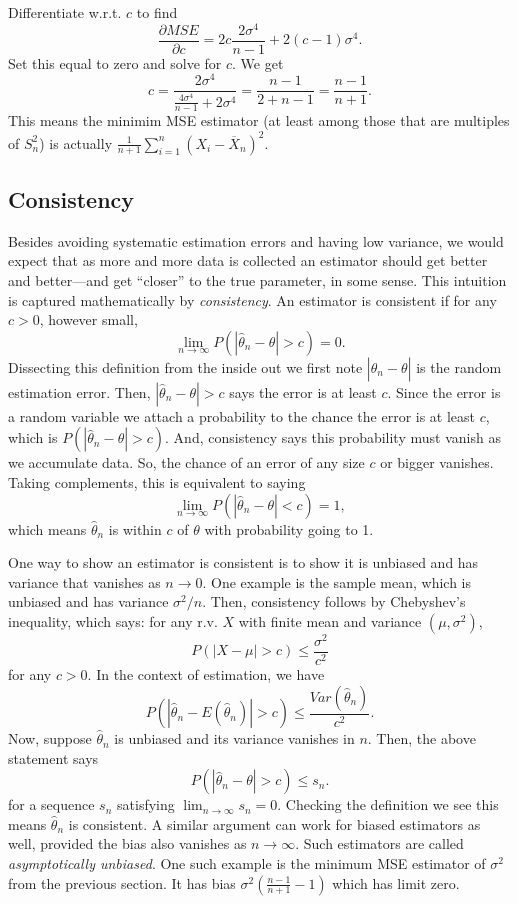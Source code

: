 \documentclass[]{book}
\begin{document}
Differentiate w.r.t. \(c\) to find
\[\frac{\partial MSE}{\partial c} = 2c \frac{2\sigma^4}{n-1} + 2(c-1)\sigma^4.\]
Set this equal to zero and solve for \(c\). We get
\[c = \frac{2\sigma^4}{\frac{4\sigma^4}{n-1} + 2\sigma^4} = \frac{n-1}{2+n-1} = \frac{n-1}{n+1}.\]
This means the minimim MSE estimator (at least among those that are
multiples of \(S_n^2\)) is actually
\(\frac{1}{n+1}\sum_{i=1}^n (X_i - \overline X_n)^2\).

\subsection{Consistency}\label{consistency}

Besides avoiding systematic estimation errors and having low variance,
we would expect that as more and more data is collected an estimator
should get better and better---and get ``closer'' to the true parameter,
in some sense. This intuition is captured mathematically by
\emph{consistency}. An estimator is consistent if for any \(c>0\),
however small,
\[\lim_{n\rightarrow \infty} P(|\hat\theta_n-\theta|>c) = 0.\]
Dissecting this definition from the inside out we first note
\(|\hat\theta_n - \theta|\) is the random estimation error. Then,
\(|\hat\theta_n-\theta|>c\) says the error is at least \(c\). Since the
error is a random variable we attach a probability to the chance the
error is at least \(c\), which is \(P(|\hat\theta_n-\theta|>c)\). And,
consistency says this probability must vanish as we accumulate data. So,
the chance of an error of any size \(c\) or bigger vanishes. Taking
complements, this is equivalent to saying
\[\lim_{n\rightarrow \infty} P(|\hat\theta_n-\theta|<c) = 1,\] which
means \(\hat\theta_n\) is within \(c\) of \(\theta\) with probability
going to 1.

One way to show an estimator is consistent is to show it is unbiased and
has variance that vanishes as \(n\rightarrow 0\). One example is the
sample mean, which is unbiased and has variance \(\sigma^2/n\). Then,
consistency follows by Chebyshev's inequality, which says: for any r.v.
\(X\) with finite mean and variance \((\mu, \sigma^2)\),
\[P(|X - \mu|>c)\leq \frac{\sigma^2}{c^2}\] for any \(c>0\). In the
context of estimation, we have
\[P(|\hat\theta_n - E(\hat\theta_n)|>c) \leq \frac{Var(\hat\theta_n)}{c^2}.\]
Now, suppose \(\hat\theta_n\) is unbiased and its variance vanishes in
\(n\). Then, the above statement says
\[P(|\hat\theta_n - \theta|>c) \leq s_n.\] for a sequence \(s_n\)
satisfying \(\lim_{n\rightarrow \infty} s_n = 0\). Checking the
definition we see this means \(\hat\theta_n\) is consistent. A similar
argument can work for biased estimators as well, provided the bias also
vanishes as \(n\rightarrow\infty\). Such estimators are called
\emph{asymptotically unbiased}. One such example is the minimum MSE
estimator of \(\sigma^2\) from the previous section. It has bias
\(\sigma^2(\frac{n-1}{n+1}-1)\) which has limit zero.
\end{document}

